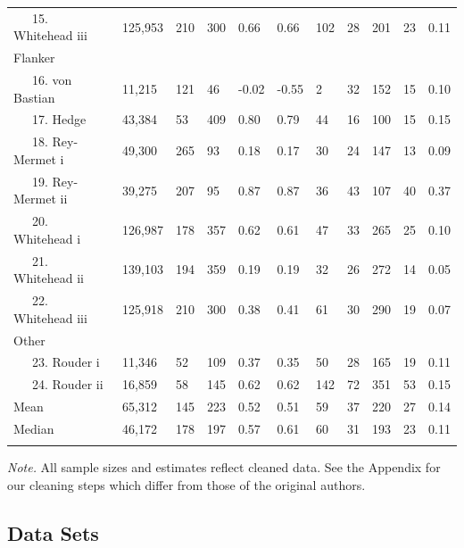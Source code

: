 \documentclass[
  english,
  ,man]{apa6}
\begin{document}
\begin{table}[tbp]
\begin{center}
\begin{threeparttable}
\begin{tabular}{lllllllllll}
\ \ \ 15. Whitehead iii & 125,953 & 210 & 300 & 0.66 & 0.66 & 102 & 28 & 201 & 23 & 0.11\\
Flanker &  &  &  &  &  &  &  &  &  & \\
\ \ \ 16. von Bastian & 11,215 & 121 & 46 & -0.02 & -0.55 & 2 & 32 & 152 & 15 & 0.10\\
\ \ \ 17. Hedge & 43,384 & 53 & 409 & 0.80 & 0.79 & 44 & 16 & 100 & 15 & 0.15\\
\ \ \ 18. Rey-Mermet i & 49,300 & 265 & 93 & 0.18 & 0.17 & 30 & 24 & 147 & 13 & 0.09\\
\ \ \ 19. Rey-Mermet ii & 39,275 & 207 & 95 & 0.87 & 0.87 & 36 & 43 & 107 & 40 & 0.37\\
\ \ \ 20. Whitehead i & 126,987 & 178 & 357 & 0.62 & 0.61 & 47 & 33 & 265 & 25 & 0.10\\
\ \ \ 21. Whitehead ii & 139,103 & 194 & 359 & 0.19 & 0.19 & 32 & 26 & 272 & 14 & 0.05\\
\ \ \ 22. Whitehead iii & 125,918 & 210 & 300 & 0.38 & 0.41 & 61 & 30 & 290 & 19 & 0.07\\
Other &  &  &  &  &  &  &  &  &  & \\
\ \ \ 23. Rouder i & 11,346 & 52 & 109 & 0.37 & 0.35 & 50 & 28 & 165 & 19 & 0.11\\
\ \ \ 24. Rouder ii & 16,859 & 58 & 145 & 0.62 & 0.62 & 142 & 72 & 351 & 53 & 0.15\\ \midrule
Mean & 65,312 & 145 & 223 & 0.52 & 0.51 & 59 & 37 & 220 & 27 & 0.14\\
Median & 46,172 & 178 & 197 & 0.57 & 0.61 & 60 & 31 & 193 & 23 & 0.11\\
\bottomrule
\addlinespace
\end{tabular}

\begin{tablenotes}[para]
\normalsize{\textit{Note.} All sample sizes and estimates reflect cleaned data.  See the Appendix for our cleaning steps which differ from those of the original authors.}
\end{tablenotes}

\end{threeparttable}
\end{center}

\end{table}

\hypertarget{data-sets}{%
\subsection{Data Sets}\label{data-sets}}
\end{document}
